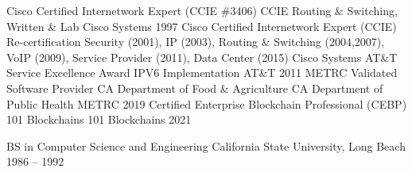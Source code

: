 \documentclass[]{awesome-cv}
\begin{document}
\vspace{-7mm}

\begin{cvhonors}
	\cvhonor
	{Cisco Certified Internetwork Expert (CCIE \#3406)}
	{CCIE Routing \& Switching, Written \& Lab}
	{Cisco Systems}
	{1997}
	\cvhonor
	{Cisco Certified Internetwork Expert (CCIE) Re-certification}
	{Security (2001), IP (2003), Routing \& Switching (2004,2007), VoIP (2009), Service Provider (2011), Data Center (2015)}
	{Cisco Systems}
	{}
	\cvhonor
	{AT\&T Service Excellence Award}
	{IPV6 Implementation}
	{AT\&T}
	{2011}
	\cvhonor
	{METRC Validated Software Provider}
	{CA Department of Food \& Agriculture \textbar{} CA Department of Public Health}
	{METRC}
	{2019}
	\cvhonor
	{Certified Enterprise Blockchain Professional (CEBP)}
	{101 Blockchains}
	{101 Blockchains}
	{2021}
\end{cvhonors}
\begin{cventries}
	\cventry
	{BS in Computer Science and Engineering}
	{California State University, Long Beach}
	{}
	{1986 – 1992}
	{}
\end{cventries}

\vspace{-2mm}
\ 
\end{document}
